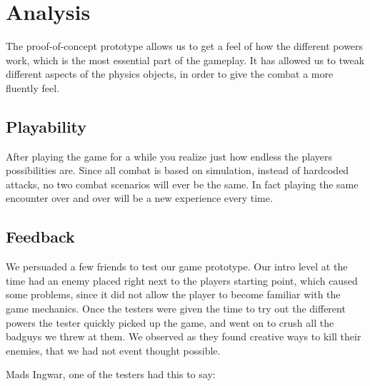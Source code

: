 \section{Analysis} %

The proof-of-concept prototype allows us to get a feel of how the different powers work, which is the most essential part of the gameplay. It has allowed us to tweak different aspects of the physics objects, in order to give the combat a more fluently feel. 
\subsection{Playability} %
	After playing the game for a while you realize just how endless the players possibilities are. Since all combat is based on simulation, instead of hardcoded attacks, no two combat scenarios will ever be the same. In fact playing the same encounter over and over will be a new experience every time. 



\subsection{Feedback} %
We persuaded a few friends to test our game prototype. Our intro level at the time had an enemy placed right next to the players starting point, which caused some problems, since it did not allow the player to become familiar with the game mechanics.  Once the testers were given the time to try out the different powers the tester quickly picked up the game, and went on to crush all the badguys we threw at them. We observed as they found creative ways to kill their enemies, that we had not event thought possible.

Mads Ingwar, one of the testers had this to say:



